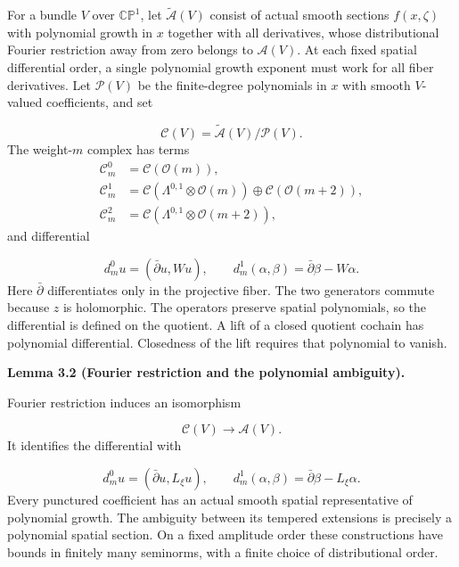 \documentclass[
  english,
  11pt,
  reqno]{amsart}
\makeatletter
\newcommand{\pandocstatementheading}[1]{%
  \par\addpenalty{\@beginparpenalty}%
  \addvspace{.5\baselineskip plus .2\baselineskip minus .2\baselineskip}%
  {\normalfont\bfseries #1\par}%
  \nobreak\@afterindenttrue\@afterheading
}
\makeatother
\begin{document}
For a bundle \(V\) over \(\mathbb{CP}^1\), let
\(\widetilde{\mathscr A}(V)\) consist of actual smooth sections
\(f(x,\zeta)\) with polynomial growth in \(x\) together with all
derivatives, whose distributional Fourier restriction away from zero
belongs to \(\mathscr A(V)\). At each fixed spatial differential order,
a single polynomial growth exponent must work for all fiber derivatives.
Let \(\mathscr P(V)\) be the finite-degree polynomials in \(x\) with
smooth \(V\)-valued coefficients, and set

\label{eq:online-root-spatial-polynomial-quotient} \[
\mathscr C(V)=\widetilde{\mathscr A}(V)/\mathscr P(V).
\] The weight-\(m\) complex has terms \[
\begin{aligned}
\mathscr C_m^0&=\mathscr C(\mathcal O(m)),\\
\mathscr C_m^1&=\mathscr C(\Lambda^{0,1}\otimes\mathcal O(m))
\oplus\mathscr C(\mathcal O(m+2)),\\
\mathscr C_m^2&=\mathscr C(\Lambda^{0,1}\otimes\mathcal O(m+2)),
\end{aligned}
\] and differential

\label{eq:online-root-spatial-differential} \[
d_m^0u=(\bar\partial u,Wu),
\qquad
d_m^1(\alpha,\beta)=\bar\partial\beta-W\alpha.
\] Here \(\bar\partial\) differentiates only in the projective fiber.
The two generators commute because \(z\) is holomorphic. The operators
preserve spatial polynomials, so the differential is defined on the
quotient. A lift of a closed quotient cochain has polynomial
differential. Closedness of the lift requires that polynomial to vanish.

\pandocstatementheading{\leavevmode{}\label{lem:online-fourier-polynomial-quotient}Lemma 3.2 (Fourier restriction and the polynomial ambiguity).}

Fourier restriction induces an isomorphism

\label{eq:online-root-fourier-quotient-isomorphism} \[
\mathscr C(V)\longrightarrow\mathscr A(V).
\] It identifies the differential with

\label{eq:online-root-frequency-differential} \[
d_m^0u=(\bar\partial u,L_\xi u),
\qquad
d_m^1(\alpha,\beta)=\bar\partial\beta-L_\xi\alpha.
\] Every punctured coefficient has an actual smooth spatial
representative of polynomial growth. The ambiguity between its tempered
extensions is precisely a polynomial spatial section. On a fixed
amplitude order these constructions have bounds in finitely many
seminorms, with a finite choice of distributional order.
\end{document}
